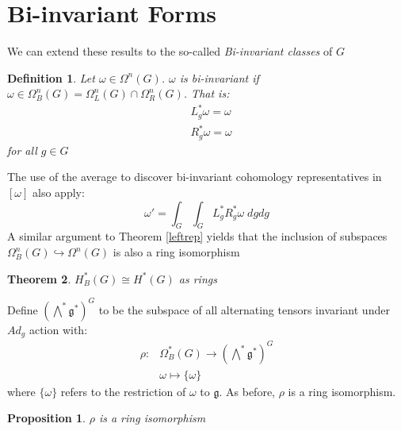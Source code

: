 \documentclass[12pt]{amsart}
\newtheorem{theorem}{Theorem}[section]
\newtheorem{proposition}{Proposition}[theorem]
\newtheorem{definition}[theorem]{Definition}
\numberwithin{equation}{section}
\begin{document}
\section{Bi-invariant Forms}
We can extend these results to the so-called \emph{Bi-invariant classes} of $G$
%
\begin{definition}
  Let $\omega \in \Omega^n(G)$. $\omega$ is bi-invariant if $\omega \in \Omega_B^n(G) = \Omega_L^n(G) \cap \Omega_R^n(G)$. That is:
  \begin{align*}
    & L^*_g\omega = \omega \\
    &  R^*_g\omega = \omega
  \end{align*}
  for all $g \in G$
\end{definition}
%
The use of the average to discover bi-invariant cohomology representatives in $[\omega]$ also apply:
\begin{equation}
  \omega' = \int_{G}\int_{G} L^*_{g}R^*_{g}\omega \; dg dg
\end{equation}
A similar argument to Theorem \ref{leftrep} yields that the inclusion of subspaces $\Omega_B^n(G) \hookrightarrow \Omega^n(G)$ is also a ring isomorphism
%
\begin{theorem}
  $H_B^{*}(G) \cong H^*(G)$ as rings
\end{theorem}
%
\noindent Define $\left( \bigwedge^*\mathfrak{g}^* \right)^G$ to be the subspace of all alternating tensors invariant under $Ad_g$ action with:
\begin{align*}
\rho: & \Omega_B^*(G) \rightarrow \left( \bigwedge^*\mathfrak{g}^* \right)^G \\
      & \omega \mapsto \{\omega\}
\end{align*}
where $\{\omega\}$ refers to the restriction of $\omega$ to $\mathfrak{g}$. As before, $\rho$ is a ring isomorphism.
%
\begin{proposition}
$\rho$ is a ring isomorphism
\end{proposition}
%
\end{document}
